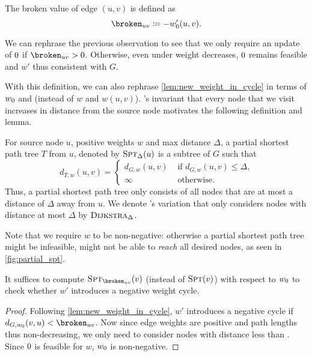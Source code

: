 \begin{definition}[\brokuv] 
  The broken value \brokuv of edge $(u, v)$ is defined as \[
    \brokuv \Def -\wpot'(u, v).
  \] 
\end{definition}

\noindent We can rephrase the previous observation to see that we only require an update of $\pot$ if $\brokuv > 0$.
Otherwise, even under weight decreases, $\pot$ remains feasible and $w'$ thus consistent with $G$.

With this definition, we can also rephrase \cref{lem:new_weight_in_cycle} in terms of $\wpot$ and \brokuv (instead of $w$ and $w(u, v)$).
\algdk's invariant that every node that we visit increases in distance from the source node motivates the following definition and lemma.

\begin{definition}
  For source node $u$, positive weights $w$ and max distance $\Delta$, a partial shortest path tree $T$ from $u$, denoted by $\textsc{Spt}_{\Delta}(u)$ is a subtree of $G$ such that \[
    d_{T, w}(u, v) = \begin{cases}
      d_{G, w}(u, v) & \text{ if $d_{G, w}(u, v) \leq \Delta$,} \\
      \infty & \text{ otherwise.}
    \end{cases}
  \] Thus, a partial shortest path tree only consists of all nodes that are at most a distance of $\Delta$ away from $u$.
  We denote \algdk's variation that only considers nodes with distance at most $\Delta$ by $\textsc{Dijkstra}_\Delta$.
\end{definition}

\noindent Note that we require $w$ to be non-negative: otherwise a partial shortest path tree might be infeasible, \ie might not be able to \emph{reach} all desired nodes, as seen in \cref{fig:partial_spt}.

\begin{lemma}
  It suffices to compute $\pspt{\brokuv}(v)$ (instead of $\textsc{Spt}(v)$) with respect to $\wpot$ to check whether $w'$ introduces a negative weight cycle.
\end{lemma}
\begin{proof}
  Following \cref{lem:new_weight_in_cycle}, $w'$ introduces a negative cycle if $d_{G, \wpot}(v, u) < \brokuv$.
  Now since edge weights are positive and path lengths thus non-decreasing, we only need to consider nodes with distance less than \brokuv.
  Since $\pot$ is feasible for $w$, $\wpot$ is non-negative.
\end{proof}

